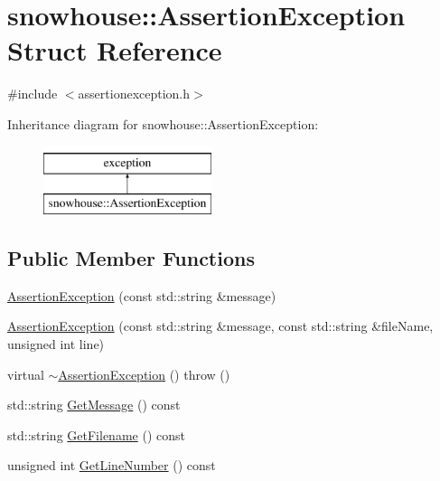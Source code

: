 \hypertarget{structsnowhouse_1_1AssertionException}{}\section{snowhouse\+::Assertion\+Exception Struct Reference}
\label{structsnowhouse_1_1AssertionException}


{\ttfamily \#include $<$assertionexception.\+h$>$}

Inheritance diagram for snowhouse\+::Assertion\+Exception\+:\begin{figure}[H]
\begin{center}
\leavevmode
\includegraphics[height=2.000000cm]{structsnowhouse_1_1AssertionException}
\end{center}
\end{figure}
\subsection*{Public Member Functions}
\begin{DoxyCompactItemize}
\item 
\mbox{\hyperlink{structsnowhouse_1_1AssertionException_a290511db2fc35fcf96b58a39f31cdd1f}{Assertion\+Exception}} (const std\+::string \&message)
\item 
\mbox{\hyperlink{structsnowhouse_1_1AssertionException_a10d88d440c3bd5649c5ba1461584d01b}{Assertion\+Exception}} (const std\+::string \&message, const std\+::string \&file\+Name, unsigned int line)
\item 
virtual \mbox{\hyperlink{structsnowhouse_1_1AssertionException_af839017f6903240040a59c11b059ae6a}{$\sim$\+Assertion\+Exception}} ()  throw ()
\item 
std\+::string \mbox{\hyperlink{structsnowhouse_1_1AssertionException_acbbf150f0c8c6ac170cbfb52dbdd9a44}{Get\+Message}} () const
\item 
std\+::string \mbox{\hyperlink{structsnowhouse_1_1AssertionException_a1d6600802fdabaa1b3ba926d1dc13fa8}{Get\+Filename}} () const
\item 
unsigned int \mbox{\hyperlink{structsnowhouse_1_1AssertionException_a8c0a9603001f93f38f3fea1becabfb0b}{Get\+Line\+Number}} () const
\end{DoxyCompactItemize}


